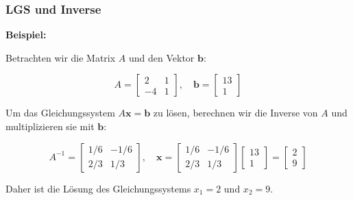 \documentclass{beamer}
\begin{document}
\begin{frame}
  \frametitle{LGS und Inverse}
  \textbf{Beispiel:}
  
  Betrachten wir die Matrix $A$ und den Vektor $\mathbf{b}$:
  
  \[
  A = \begin{bmatrix} 2 & 1 \\ -4 & 1 \end{bmatrix}, \quad \mathbf{b} = \begin{bmatrix} 13 \\ 1 \end{bmatrix}
  \]
  
  Um das Gleichungssystem $A \mathbf{x} = \mathbf{b}$ zu lösen, berechnen wir die Inverse von $A$ und multiplizieren sie mit $\mathbf{b}$:
  
  \[
  A^{-1} = \begin{bmatrix} 1/6 & -1/6 \\ 2/3 & 1/3 \end{bmatrix}, \quad \mathbf{x} = \begin{bmatrix}  1/6 & -1/6 \\ 2/3 & 1/3  \end{bmatrix} \begin{bmatrix} 13 \\ 1 \end{bmatrix} = \begin{bmatrix} 2 \\ 9 \end{bmatrix}
  \]
  
  Daher ist die Lösung des Gleichungssystems $x_1 = 2$ und $x_2 = 9$. 
\end{frame}
\end{document}
